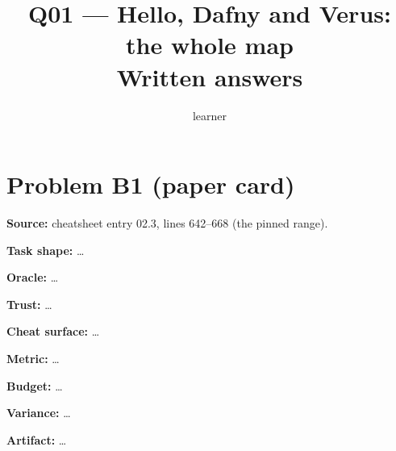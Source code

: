 \documentclass[11pt]{article}
\title{Q01 --- Hello, Dafny and Verus: the whole map \\ \large Written answers}
\author{learner}
\date{}
\begin{document}
\maketitle

\section*{Problem B1 (paper card)}\label{ans:B1}
\begin{answer}
\textbf{Source:} cheatsheet entry 02.3, lines 642--668 (the pinned range).

\textbf{Task shape:} \dots

\textbf{Oracle:} \dots

\textbf{Trust:} \dots

\textbf{Cheat surface:} \dots

\textbf{Metric:} \dots

\textbf{Budget:} \dots

\textbf{Variance:} \dots

\textbf{Artifact:} \dots
\end{answer}
\end{document}
